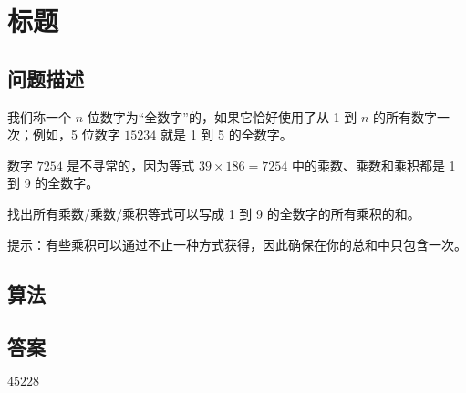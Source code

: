 \section{标题}
\subsection{问题描述}
\begin{tcolorbox}
	我们称一个 $n$ 位数字为“全数字”的，如果它恰好使用了从 1 到 $n$ 的所有数字一次；例如，5 位数字 $15234$ 就是 1 到 5 的全数字。

	数字 $7254$ 是不寻常的，因为等式 $39 \times 186 = 7254$ 中的乘数、乘数和乘积都是 1 到 9 的全数字。

	找出所有乘数/乘数/乘积等式可以写成 1 到 9 的全数字的所有乘积的和。

	提示：有些乘积可以通过不止一种方式获得，因此确保在你的总和中只包含一次。
\end{tcolorbox}

\subsection{算法}

\subsection{答案}
$45228$
